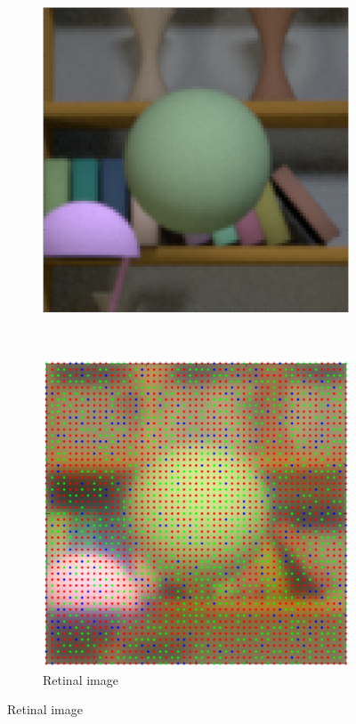 \documentclass{jov}
\begin{document}
\begin{figure}
\begin{subfigure}[b]{0.19 \textwidth}
        \includegraphics[width=\textwidth]{../FiguresDraft4/Figure9/Figure9_b.png}
        \label{fig:croppedImage}
    \end{subfigure}
    ~ 
    \begin{subfigure}[b]{0.19 \textwidth}
    \hspace{0.1 \textwidth}
        \caption{Retinal image}
        \vspace{1.5mm}
        \includegraphics[width=\textwidth]{../FiguresDraft4/Figure9/Figure9_c.png}

\end{subfigure}
\end{figure}
\end{document}
